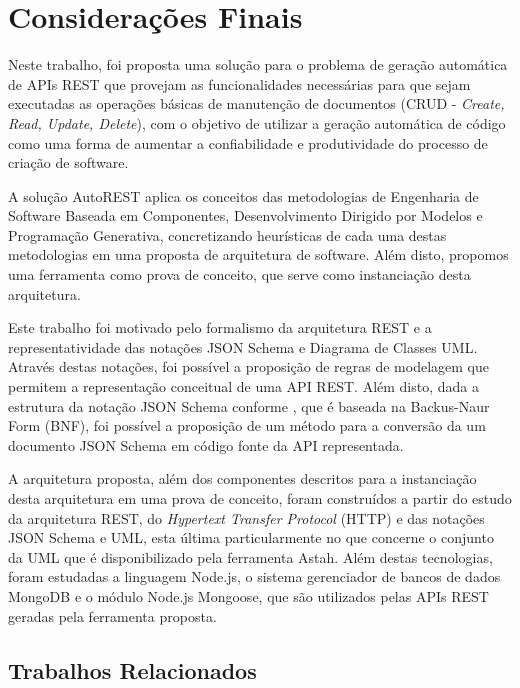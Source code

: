 \chapter{Considerações Finais}
\label{chap:concl}

Neste trabalho, foi proposta uma solução para o problema de geração automática de APIs REST que provejam as funcionalidades necessárias para que sejam executadas as operações básicas de manutenção de documentos (CRUD - \textit{Create, Read, Update, Delete}), com o objetivo de utilizar a geração automática de código como uma forma de aumentar a confiabilidade e produtividade do processo de criação de software.

A solução AutoREST aplica os conceitos das metodologias de Engenharia de Software Baseada em Componentes, Desenvolvimento Dirigido por Modelos e Programação Generativa, concretizando heurísticas de cada uma destas metodologias em uma proposta de arquitetura de software. Além disto, propomos uma ferramenta como prova de conceito, que serve como instanciação desta arquitetura.

Este trabalho foi motivado pelo formalismo da arquitetura REST e a representatividade das notações JSON Schema e Diagrama de Classes UML. Através destas notações, foi possível a proposição de regras de modelagem que permitem a representação conceitual de uma API REST. Além disto, dada a estrutura da notação JSON Schema conforme , que é baseada na Backus-Naur Form (BNF), foi possível a proposição de um método para a conversão da um documento JSON Schema em código fonte da API representada.

A arquitetura proposta, além dos componentes descritos para a instanciação desta arquitetura em uma prova de conceito, foram construídos a partir do estudo da arquitetura REST, do \textit{Hypertext Transfer Protocol} (HTTP) e das notações JSON Schema e UML, esta última particularmente no que concerne o conjunto da UML que é disponibilizado pela ferramenta Astah. Além destas tecnologias, foram estudadas a linguagem Node.js, o sistema gerenciador de bancos de dados MongoDB e o módulo Node.js Mongoose, que são utilizados pelas APIs REST geradas pela ferramenta proposta.


\section{Trabalhos Relacionados}
\label{sec:related}

